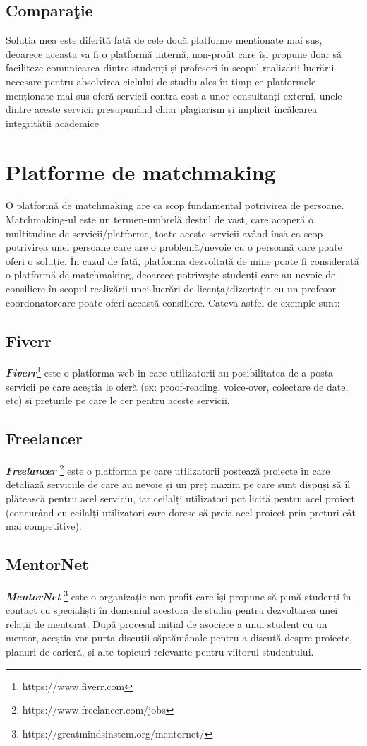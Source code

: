 \documentclass[12pt,a4paper,hidelinks]{report}
\theoremstyle{definition}
\theoremstyle{remark}
\begin{document}
\subsection{Compara\c tie}
Soluția mea este diferită față de cele două platforme menționate mai sus, deoarece aceasta va fi o platformă internă, non-profit care își propune doar să faciliteze comunicarea dintre studenți și profesori în scopul realizării lucrării necesare pentru absolvirea ciclului de studiu ales în timp ce platformele menționate mai sus oferă servicii contra cost a unor consultanți externi, unele dintre aceste servicii presupunând chiar plagiarism și implicit încălcarea integrității academice
\section{Platforme de matchmaking}
O platformă de matchmaking are ca scop fundamental potrivirea de persoane. Matchmaking-ul este un termen-umbrelă destul de vast, care acoperă o multitudine de servicii/platforme, toate aceste servicii având însă ca scop potrivirea unei persoane care are o problemă/nevoie cu o persoană care poate oferi o soluție. În cazul de față, platforma dezvoltată de mine poate fi considerată o platformă de matchmaking, deoarece potrivește studenți care au nevoie de consiliere în scopul realizării unei lucrări de licența/dizertație cu un profesor coordonatorcare poate oferi această consiliere.
Cateva astfel de exemple sunt:
\subsection{Fiverr}
\textbf{\textit{Fiverr}}\footnote[1]{https://www.fiverr.com} este o platforma web in care utilizatorii au posibilitatea de a posta servicii pe care aceștia le oferă (ex: proof-reading, voice-over, colectare de date, etc) și prețurile pe care le cer pentru aceste servicii.
\subsection{Freelancer}
\textbf{\textit{Freelancer}} \footnote[2]{https://www.freelancer.com/jobs} este o platforma pe care utilizatorii postează proiecte în care detaliază serviciile de care au nevoie și un preț maxim pe care sunt dispuși să îl plătească pentru acel serviciu, iar ceilalți utilizatori pot licită pentru acel proiect (concurând cu ceilalți utilizatori care doresc să preia acel proiect prin prețuri cât mai competitive).
\subsection{MentorNet}
\textbf{\textit{MentorNet}} \footnote[3]{https://greatmindsinstem.org/mentornet/} este o organizație non-profit care își propune să pună studenți în contact cu specialiști în domeniul acestora de studiu pentru dezvoltarea unei relații de mentorat. După procesul inițial de asociere a unui student cu un mentor, aceștia vor purta discuții săptămânale  pentru a discută despre proiecte, planuri de carieră, și alte topicuri relevante pentru viitorul studentului.
\end{document}

